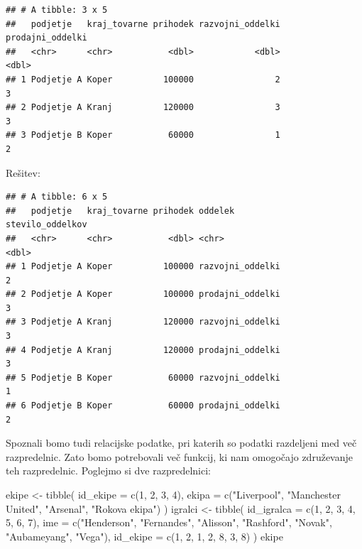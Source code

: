 \documentclass[
]{book}
\newenvironment{Shaded}{\begin{snugshade}}{\end{snugshade}}
\newcommand{\AttributeTok}[1]{\textcolor[rgb]{0.77,0.63,0.00}{#1}}
\newcommand{\DecValTok}[1]{\textcolor[rgb]{0.00,0.00,0.81}{#1}}
\newcommand{\FunctionTok}[1]{\textcolor[rgb]{0.00,0.00,0.00}{#1}}
\newcommand{\NormalTok}[1]{#1}
\newcommand{\OtherTok}[1]{\textcolor[rgb]{0.56,0.35,0.01}{#1}}
\newcommand{\StringTok}[1]{\textcolor[rgb]{0.31,0.60,0.02}{#1}}
\begin{document}
\begin{verbatim}
## # A tibble: 3 x 5
##   podjetje   kraj_tovarne prihodek razvojni_oddelki prodajni_oddelki
##   <chr>      <chr>           <dbl>            <dbl>            <dbl>
## 1 Podjetje A Koper          100000                2                3
## 2 Podjetje A Kranj          120000                3                3
## 3 Podjetje B Koper           60000                1                2
\end{verbatim}

Rešitev:

\begin{verbatim}
## # A tibble: 6 x 5
##   podjetje   kraj_tovarne prihodek oddelek          stevilo_oddelkov
##   <chr>      <chr>           <dbl> <chr>                       <dbl>
## 1 Podjetje A Koper          100000 razvojni_oddelki                2
## 2 Podjetje A Koper          100000 prodajni_oddelki                3
## 3 Podjetje A Kranj          120000 razvojni_oddelki                3
## 4 Podjetje A Kranj          120000 prodajni_oddelki                3
## 5 Podjetje B Koper           60000 razvojni_oddelki                1
## 6 Podjetje B Koper           60000 prodajni_oddelki                2
\end{verbatim}

Spoznali bomo tudi relacijske podatke, pri katerih so podatki razdeljeni med več razpredelnic. Zato bomo potrebovali več funkcij, ki nam omogočajo združevanje teh razpredelnic. Poglejmo si dve razpredelnici:

\begin{Shaded}
\begin{Highlighting}[]
\NormalTok{ekipe }\OtherTok{\textless{}{-}} \FunctionTok{tibble}\NormalTok{(}
  \AttributeTok{id\_ekipe =} \FunctionTok{c}\NormalTok{(}\DecValTok{1}\NormalTok{, }\DecValTok{2}\NormalTok{, }\DecValTok{3}\NormalTok{, }\DecValTok{4}\NormalTok{),}
  \AttributeTok{ekipa =} \FunctionTok{c}\NormalTok{(}\StringTok{"Liverpool"}\NormalTok{, }\StringTok{"Manchester United"}\NormalTok{, }\StringTok{"Arsenal"}\NormalTok{, }\StringTok{"Rokova ekipa"}\NormalTok{)}
\NormalTok{)}
\NormalTok{igralci }\OtherTok{\textless{}{-}} \FunctionTok{tibble}\NormalTok{(}
  \AttributeTok{id\_igralca =} \FunctionTok{c}\NormalTok{(}\DecValTok{1}\NormalTok{, }\DecValTok{2}\NormalTok{, }\DecValTok{3}\NormalTok{, }\DecValTok{4}\NormalTok{, }\DecValTok{5}\NormalTok{, }\DecValTok{6}\NormalTok{, }\DecValTok{7}\NormalTok{),}
  \AttributeTok{ime =} \FunctionTok{c}\NormalTok{(}\StringTok{"Henderson"}\NormalTok{, }\StringTok{"Fernandes"}\NormalTok{, }\StringTok{"Alisson"}\NormalTok{, }\StringTok{"Rashford"}\NormalTok{, }\StringTok{"Novak"}\NormalTok{, }\StringTok{"Aubameyang"}\NormalTok{, }\StringTok{"Vega"}\NormalTok{),}
  \AttributeTok{id\_ekipe =} \FunctionTok{c}\NormalTok{(}\DecValTok{1}\NormalTok{, }\DecValTok{2}\NormalTok{, }\DecValTok{1}\NormalTok{, }\DecValTok{2}\NormalTok{, }\DecValTok{8}\NormalTok{, }\DecValTok{3}\NormalTok{, }\DecValTok{8}\NormalTok{)}
\NormalTok{)}
\NormalTok{ekipe}
\end{Highlighting}
\end{Shaded}
\end{document}
